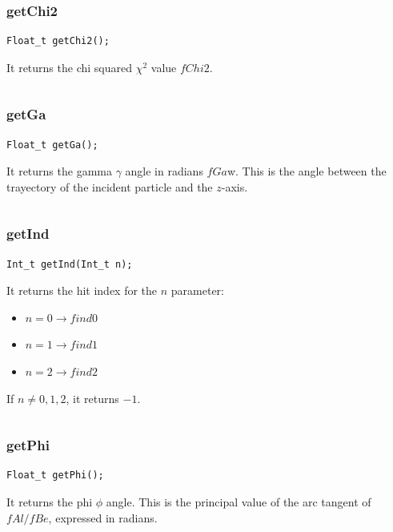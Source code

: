\documentclass[a4paper]{book}
\begin{document}
\subsubsection{getChi2}

\begin{lstlisting}
Float_t getChi2();
\end{lstlisting}

It returns the chi squared $\chi^2$ value $fChi2$.

\[\]

\subsubsection{getGa}

\begin{lstlisting}
Float_t getGa();
\end{lstlisting}

It returns the gamma $\gamma$ angle in radians $fGa$w. This is the angle between the trayectory of the incident particle and the $z$-axis.

\[\]

\subsubsection{getInd}

\begin{lstlisting}
Int_t getInd(Int_t n);
\end{lstlisting}

It returns the hit index for the $n$ parameter:
\begin{itemize}
	\item $n = 0 \rightarrow find0$
	\item $n = 1 \rightarrow find1$
	\item $n = 2 \rightarrow find2$
\end{itemize}

If $n \neq 0, 1, 2$, it returns $-1$.

\[\]

\subsubsection{getPhi}

\begin{lstlisting}
Float_t getPhi();
\end{lstlisting}

It returns the phi $\phi$ angle. This is the principal value of the arc tangent of $fAl/fBe$, expressed in radians.
\end{document}
